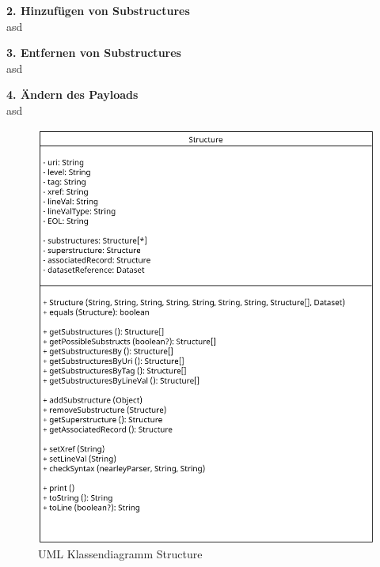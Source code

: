 \vspace{1em}
\textbf{2. Hinzufügen von Substructures} \vspace{0.5em} \\
asd

\vspace{1em}
\textbf{3. Entfernen von Substructures} \vspace{0.5em} \\
asd

\vspace{1em}
\textbf{4. Ändern des Payloads} \vspace{0.5em} \\
asd


\begin{figure}[h]
	\centering
	\includegraphics[width=1\textwidth]{images/UML_Class_Structure.png}
	\caption{UML Klassendiagramm Structure}
	\label{fig: UML Klassendiagramm Structure}
\end{figure}

